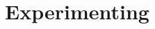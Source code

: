 \documentclass[11pt,fleqn]{book} %
\begin{document}


																																																																																																																																																																																																																					    \chapter{Experimenting}
\end{document}
